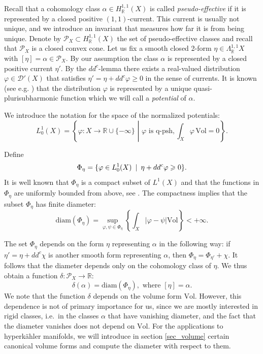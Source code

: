 \documentclass[11pt]{article}
\newcommand{\6}{\partial}
\newcommand{\bbR}{\mathbb{R}}
\newcommand{\DD}{\mathcal{D}}
\newcommand{\PP}{\mathcal{P}}
\renewcommand{\ge}{\geqslant}
\newcommand{\st}{\enskip |\enskip}
\newcommand{\Vol}{\mathrm{Vol}}
\begin{document}
Recall that a cohomology class $\alpha\in H^{1,1}_{\bbR}(X)$
is called {\em pseudo-effective} if it is represented by a closed positive $(1,1)$-current.
This current is usually not unique, and we introduce an invariant that measures how far
it is from being unique.
Denote by $\PP_X \subset H^{1,1}_{\bbR}(X)$ the set of pseudo-effective classes and
recall that $\PP_X$ is a closed convex cone. 
Let us fix a smooth closed 2-form $\eta\in\Lambda^{1,1}_{\bbR}X$ with $[\eta]=\alpha\in \PP_X$.
By our assumption the class $\alpha$ is represented by a closed positive current $\eta'$.
By the $dd^c$-lemma there exists a real-valued distribution $\varphi\in \DD'(X)$
that satisfies $\eta' = \eta+dd^c\varphi\ge 0$ in the sense of currents.
It is known (see e.g. \cite[Theorem A.5]{HL}) that the distribution $\varphi$ is represented
by a unique quasi-plurisubharmonic function which we will call a {\em potential} of $\alpha$.

We introduce the notation for the space of the normalized potentials:
$$
L^1_0(X) = \left\{ \varphi\colon X\to \bbR\cup\{-\infty\} \,\,\left\vert\,\,\right. \varphi \mbox{ is q-psh,}\, \int_X\varphi\,\Vol = 0\right\}.
$$

Define
\begin{equation}\label{eqn_potentials}
\Phi_\eta = \{\varphi\in L^1_0(X)\st \eta+dd^c \varphi \ge 0 \}.
\end{equation}
It is well known that $\Phi_\eta$ is a compact subset of $L^1(X)$ and that
the functions in $\Phi_\eta$ are uniformly bounded from above, see \cite[Proposition 8.5]{GZ}.
The compactness implies that the subset $\Phi_\eta$ has finite
diameter:
$$
\mathrm{diam}(\Phi_\eta) = \sup_{\varphi,\psi\in \Phi_\eta} \left\{\int_X|\varphi-\psi|\Vol\right\} < +\infty.
$$

The set $\Phi_\eta$ depends on the form $\eta$ representing $\alpha$
in the following way:
if $\eta' = \eta + dd^c\chi$ is another smooth form representing $\alpha$,
then $\Phi_\eta = \Phi_{\eta'} + \chi$. It follows that the diameter depends only on the cohomology
class of $\eta$. We thus obtain a function
$\delta\colon \PP_X\to \bbR$:
\begin{equation}\label{eqn_diam}
\delta(\alpha) = \mathrm{diam}(\Phi_\eta), \mbox{ where } [\eta]=\alpha.
\end{equation}
We note that the function $\delta$ depends on the volume form $\Vol$. However,
this dependence is not of primary importance for us, since we are mostly interested
in rigid classes, i.e.\ in the classes $\alpha$ that have vanishing diameter,
and the fact that the diameter vanishes does not depend on $\Vol$.
For the applications to hyperk\"ahler manifolds, we will introduce in section \ref{sec_volume}
certain canonical volume forms and compute the diameter with respect to them.
\end{document}
